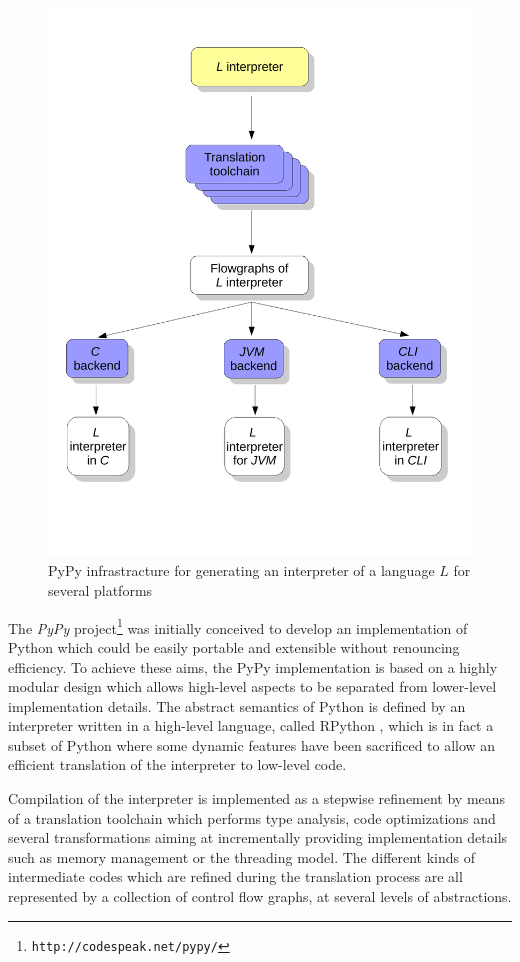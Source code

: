 \begin{figure}[h]
\begin{center}
\includegraphics[width=.6\textwidth]{diagram0}
\caption{PyPy infrastracture for generating an interpreter of a
  language $L$ for several platforms}\label{pypy-fig}
\end{center}
\end{figure}

The \emph{PyPy} project\footnote{\texttt{http://codespeak.net/pypy/}}
\cite{RigoPedroni06} was initially conceived to develop an implementation of Python which
could be easily portable and extensible without renouncing efficiency.
To achieve these aims, the PyPy implementation is based on a highly
modular design which allows high-level aspects
to be separated from lower-level implementation details.
The abstract semantics of Python is defined by an interpreter written
in a high-level language, called RPython \cite{AACM-DLS07}, which is in fact a subset of
Python where some dynamic features have been sacrificed to allow an
efficient translation of the interpreter to low-level code.

Compilation of the interpreter is implemented as a stepwise
refinement by means of a translation toolchain which performs type
analysis, code optimizations and several transformations aiming at 
incrementally providing implementation details such as memory management or the threading model.
The different kinds of intermediate codes  which are refined 
during the translation process are all represented by a collection of control flow graphs,
at several levels of abstractions.

